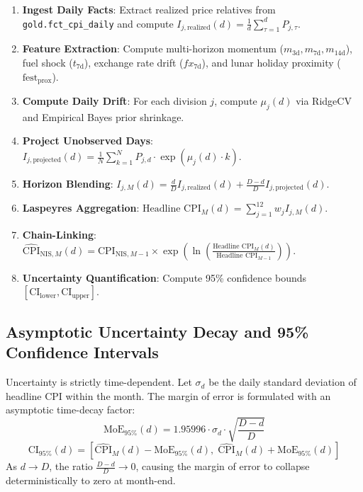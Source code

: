 \documentclass[a4paper, 11pt]{article}
\begin{document}
\begin{tcolorbox}[title=Daily Execution Algorithm (ml/nowcaster.py)]
\begin{enumerate}[noitemsep]
    \item \textbf{Ingest Daily Facts}: Extract realized price relatives from \texttt{gold.fct\_cpi\_daily} and compute $I_{j, \text{realized}}(d) = \frac{1}{d}\sum_{\tau=1}^d P_{j, \tau}$.
    \item \textbf{Feature Extraction}: Compute multi-horizon momentum ($m_{3\text{d}}, m_{7\text{d}}, m_{14\text{d}}$), fuel shock ($t_{7\text{d}}$), exchange rate drift ($fx_{7\text{d}}$), and lunar holiday proximity ($\text{fest}_{\text{prox}}$).
    \item \textbf{Compute Daily Drift}: For each division $j$, compute $\mu_j(d)$ via RidgeCV and Empirical Bayes prior shrinkage.
    \item \textbf{Project Unobserved Days}: $I_{j, \text{projected}}(d) = \frac{1}{N} \sum_{k=1}^N P_{j, d} \cdot \exp\left( \mu_j(d) \cdot k \right)$.
    \item \textbf{Horizon Blending}: $I_{j, M}(d) = \frac{d}{D} I_{j, \text{realized}}(d) + \frac{D-d}{D} I_{j, \text{projected}}(d)$.
    \item \textbf{Laspeyres Aggregation}: $\text{Headline CPI}_M(d) = \sum_{j=1}^{12} w_j I_{j, M}(d)$.
    \item \textbf{Chain-Linking}: $\widehat{\text{CPI}}_{\text{NIS}, M}(d) = \text{CPI}_{\text{NIS}, M-1} \times \exp\left( \ln\left( \frac{\text{Headline CPI}_M(d)}{\text{Headline CPI}_{M-1}} \right) \right)$.
    \item \textbf{Uncertainty Quantification}: Compute 95\% confidence bounds $[\text{CI}_{\text{lower}}, \text{CI}_{\text{upper}}]$.
\end{enumerate}
\end{tcolorbox}

\subsection{Asymptotic Uncertainty Decay and 95\% Confidence Intervals}
Uncertainty is strictly time-dependent. Let $\sigma_d$ be the daily standard deviation of headline CPI within the month. The margin of error is formulated with an asymptotic time-decay factor:
\begin{equation}
    \text{MoE}_{95\%}(d) = 1.95996 \cdot \sigma_d \cdot \sqrt{\frac{D - d}{D}}
\end{equation}
\begin{equation}
    \text{CI}_{95\%}(d) = \left[ \widehat{\text{CPI}}_M(d) - \text{MoE}_{95\%}(d), \; \widehat{\text{CPI}}_M(d) + \text{MoE}_{95\%}(d) \right]
\end{equation}
As $d \to D$, the ratio $\frac{D-d}{D} \to 0$, causing the margin of error to collapse deterministically to zero at month-end.
\end{document}
